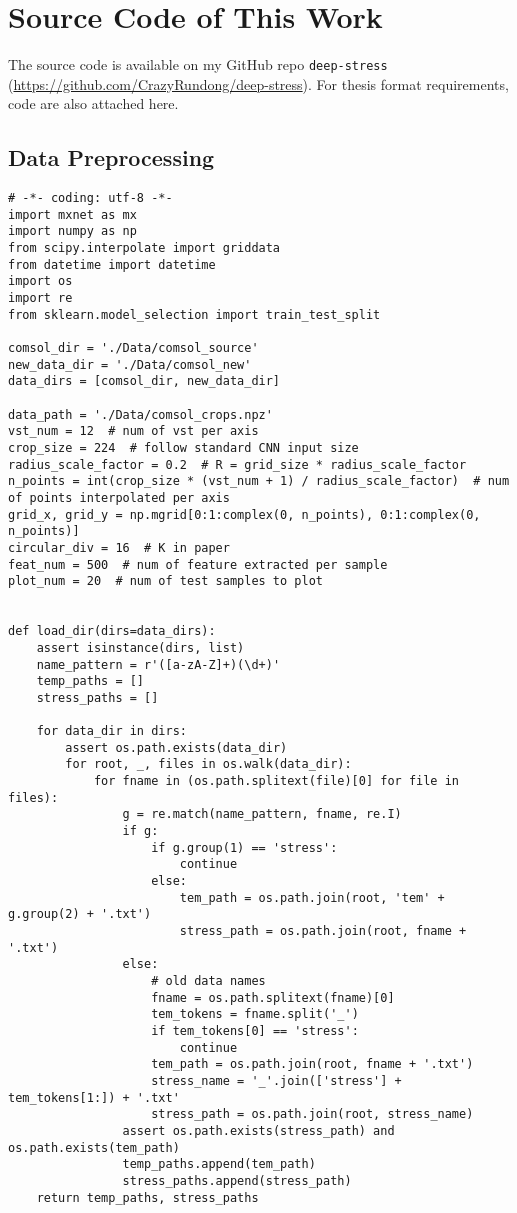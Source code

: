 
\chapter{Source Code of This Work}
The source code is available on my GitHub repo \texttt{deep-stress}
(\url{https://github.com/CrazyRundong/deep-stress}).
For thesis format requirements, code are also attached here.

\section{Data Preprocessing}
\begin{verbatim}
# -*- coding: utf-8 -*-
import mxnet as mx
import numpy as np
from scipy.interpolate import griddata
from datetime import datetime
import os
import re
from sklearn.model_selection import train_test_split

comsol_dir = './Data/comsol_source'
new_data_dir = './Data/comsol_new'
data_dirs = [comsol_dir, new_data_dir]

data_path = './Data/comsol_crops.npz'
vst_num = 12  # num of vst per axis
crop_size = 224  # follow standard CNN input size
radius_scale_factor = 0.2  # R = grid_size * radius_scale_factor
n_points = int(crop_size * (vst_num + 1) / radius_scale_factor)  # num of points interpolated per axis
grid_x, grid_y = np.mgrid[0:1:complex(0, n_points), 0:1:complex(0, n_points)]
circular_div = 16  # K in paper
feat_num = 500  # num of feature extracted per sample
plot_num = 20  # num of test samples to plot


def load_dir(dirs=data_dirs):
    assert isinstance(dirs, list)
    name_pattern = r'([a-zA-Z]+)(\d+)'
    temp_paths = []
    stress_paths = []
    
    for data_dir in dirs:
        assert os.path.exists(data_dir)
        for root, _, files in os.walk(data_dir):
            for fname in (os.path.splitext(file)[0] for file in files):
                g = re.match(name_pattern, fname, re.I)
                if g:
                    if g.group(1) == 'stress':
                        continue
                    else:
                        tem_path = os.path.join(root, 'tem' + g.group(2) + '.txt')
                        stress_path = os.path.join(root, fname + '.txt')
                else:
                    # old data names
                    fname = os.path.splitext(fname)[0]
                    tem_tokens = fname.split('_')
                    if tem_tokens[0] == 'stress':
                        continue
                    tem_path = os.path.join(root, fname + '.txt')
                    stress_name = '_'.join(['stress'] + tem_tokens[1:]) + '.txt'
                    stress_path = os.path.join(root, stress_name)
                assert os.path.exists(stress_path) and os.path.exists(tem_path)
                temp_paths.append(tem_path)
                stress_paths.append(stress_path)
    return temp_paths, stress_paths



\end{verbatim}
